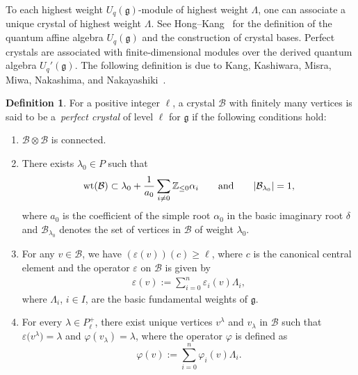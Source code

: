 \documentclass[pdftex]{sigma}
\numberwithin{equation}{section}
\theoremstyle{definition}
\newtheorem{Definition}[Theorem]{Definition}
\begin{document}
To each highest weight $U_q(\mathfrak{g})$-module of highest weight $\Lambda$, one can associate a unique crystal of highest weight $\Lambda$. See Hong--Kang~\cite[Chapters~3 and~4]{HK02} for the definition of the quantum affine algebra $U_q(\mathfrak{g})$ and the construction of crystal bases. Perfect crystals are associated with finite-dimensional modules over the derived quantum algebra $U_q'(\mathfrak{g})$. The following definition is due to Kang, Kashiwara, Misra, Miwa, Nakashima, and Nakayashiki~\cite{KMN92}.

\begin{Definition}\label{def:perfectcrystal} For a positive integer $\ell$, a crystal $\mathcal{B}$ with finitely many vertices is said to be a~\emph{perfect crystal} of level $\ell$ for $\mathfrak{g}$ if the following conditions hold:
\begin{enumerate}[label=(\roman*)]\itemsep=0pt
 \item $\mathcal{B} \otimes \mathcal{B}$ is connected.
 \item There exists $\lambda_0\in P$ such that
 \begin{align*}
 {\rm wt}(\mathcal{B}) \subset \lambda_0 + \frac{1}{a_0} \sum_{i \neq 0} \mathbb{Z}_{\leq 0} \alpha_i
 \qquad \text{and} \qquad
 |\mathcal{B}_{\lambda_0}| = 1,
 \end{align*}
 where $a_0$ is the coefficient of the simple root $\alpha_0$ in the basic imaginary root $\delta$ and $\mathcal{B}_{\lambda_0}$ denotes the set of vertices in $\mathcal{B}$ of weight $\lambda_0$.
 \item For any $v \in \mathcal{B}$, we have $ (\varepsilon(v) )(c) \geq \ell$, where $c$ is the canonical central element and the operator $\varepsilon$ on $\mathcal{B}$ is given by
 \begin{align*}
 \varepsilon(v) := \sum_{i=0}^n \varepsilon_i(v) \Lambda_i,
 \end{align*}
 where $\Lambda_i$, $i\in I$, are the basic fundamental weights of $\mathfrak{g}$.
 \item For every $\lambda\in P_\ell^+$, there exist unique vertices $v^\lambda$ and $v_\lambda$ in $\mathcal{B}$ such that $\varepsilon\bigl(v^\lambda\bigr) = \lambda$ and $\varphi(v_\lambda) = \lambda$, where the operator $\varphi$ is defined as
 \[\varphi(v) := \sum_{i=0}^n \varphi_i(v) \Lambda_i.\]
\end{enumerate}
\end{Definition}
\end{document}
